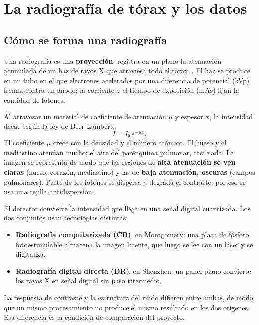 \section{La radiografía de tórax y los datos}

\subsection{Cómo se forma una radiografía}

Una radiografía es una \textbf{proyección}: registra en un plano la atenuación
acumulada de un haz de rayos X que atraviesa todo el tórax~\cite{prince2015}. El
haz se produce en un tubo en el que electrones acelerados por una diferencia de
potencial (kVp) frenan contra un ánodo; la corriente y el tiempo de exposición
(mAs) fijan la cantidad de fotones.

Al atravesar un material de coeficiente de atenuación $\mu$ y espesor $x$, la
intensidad decae según la ley de Beer-Lambert:
\begin{equation}
I = I_0 \, e^{-\mu x}.
\end{equation}
El coeficiente $\mu$ crece con la densidad y el número atómico. El hueso y el
mediastino atenúan mucho; el aire del parénquima pulmonar, casi nada. La imagen se
representa de modo que las regiones de \textbf{alta atenuación se ven claras}
(hueso, corazón, mediastino) y las de \textbf{baja atenuación, oscuras} (campos
pulmonares). Parte de los fotones se dispersa y degrada el contraste; por eso se
usa una rejilla antidispersión.

El detector convierte la intensidad que llega en una señal digital cuantizada. Los
dos conjuntos usan tecnologías distintas:

\begin{itemize}
    \item \textbf{Radiografía computarizada (CR)}, en Montgomery: una placa de
    fósforo fotoestimulable almacena la imagen latente, que luego se lee con un
    láser y se digitaliza.
    \item \textbf{Radiografía digital directa (DR)}, en Shenzhen: un panel plano
    convierte los rayos X en señal digital sin paso intermedio.
\end{itemize}

La respuesta de contraste y la estructura del ruido difieren entre ambas, de modo
que un mismo procesamiento no produce el mismo resultado en los dos orígenes. Esa
diferencia es la condición de comparación del proyecto.

